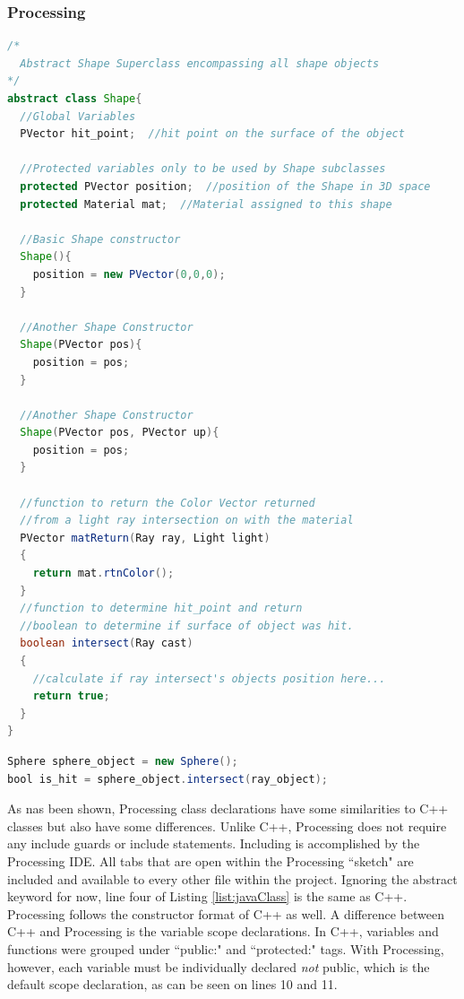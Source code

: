 \subsubsection{Processing}
\singlespacing
\begin{lstlisting}[language=Java, caption=Java Class definition example, style=mystyle, label= list:javaClass]
/*
  Abstract Shape Superclass encompassing all shape objects
*/
abstract class Shape{
  //Global Variables
  PVector hit_point;  //hit point on the surface of the object

  //Protected variables only to be used by Shape subclasses
  protected PVector position;  //position of the Shape in 3D space
  protected Material mat;  //Material assigned to this shape

  //Basic Shape constructor
  Shape(){
    position = new PVector(0,0,0);
  }

  //Another Shape Constructor
  Shape(PVector pos){
    position = pos;
  }

  //Another Shape Constructor
  Shape(PVector pos, PVector up){
    position = pos;
  }

  //function to return the Color Vector returned
  //from a light ray intersection on with the material
  PVector matReturn(Ray ray, Light light)
  {
    return mat.rtnColor();
  }
  //function to determine hit_point and return
  //boolean to determine if surface of object was hit.
  boolean intersect(Ray cast)
  {
    //calculate if ray intersect's objects position here...
    return true;
  }
}
\end{lstlisting}
\begin{lstlisting}[language=Java, caption=Java Class definition example, style=mystyle]
Sphere sphere_object = new Sphere();
bool is_hit = sphere_object.intersect(ray_object);
\end{lstlisting}
\doublespacing

As nas been shown, Processing class declarations have some similarities to C++ classes but also have some differences.  Unlike C++, Processing does not require any include guards or include statements.  Including is accomplished by the Processing IDE.  All tabs that are open within the Processing ``sketch" are included and available to every other file within the project.  Ignoring the abstract keyword for now, line four of Listing \ref{list:javaClass} is the same as C++.  Processing follows the constructor format of C++ as well.  A difference between C++ and Processing is the variable scope declarations.  In C++, variables and functions were grouped under ``public:" and ``protected:" tags. With Processing, however, each variable must be individually declared \textit{not} public, which is the default scope declaration, as can be seen on lines 10 and 11.

